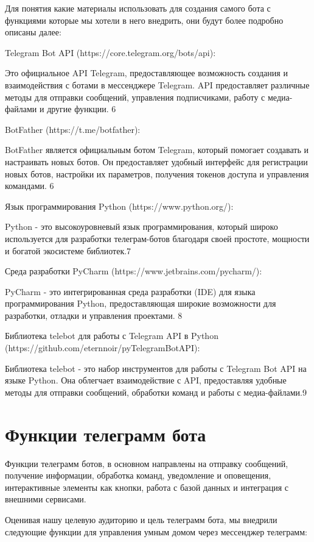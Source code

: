 Для понятия какие материалы использовать для создания самого бота с функциями которые мы хотели в него внедрить, они будут более подробно описаны далее: 

Telegram Bot API (https://core.telegram.org/bots/api):

Это официальное API Telegram, предоставляющее возможность создания и взаимодействия с ботами в мессенджере Telegram. API предоставляет различные методы для отправки сообщений, управления подписчиками, работу с медиа-файлами и другие функции. 6

BotFather (https://t.me/botfather):

BotFather является официальным ботом Telegram, который помогает создавать и настраивать новых ботов. Он предоставляет удобный интерфейс для регистрации новых ботов, настройки их параметров, получения токенов доступа и управления командами. 6

Язык программирования Python (https://www.python.org/):

Python - это высокоуровневый язык программирования, который широко используется для разработки телеграм-ботов благодаря своей простоте, мощности и богатой экосистеме библиотек.7

Среда разработки PyCharm (https://www.jetbrains.com/pycharm/):

PyCharm - это интегрированная среда разработки (IDE) для языка программирования Python, предоставляющая широкие возможности для разработки, отладки и управления проектами. 8

Библиотека telebot для работы с Telegram API в Python (https://github.com/eternnoir/pyTelegramBotAPI):

Библиотека telebot - это набор инструментов для работы с Telegram Bot API на языке Python. Она облегчает взаимодействие с API, предоставляя удобные методы для отправки сообщений, обработки команд и работы с медиа-файлами.9

\section{Функции телеграмм бота}

Функции телеграмм ботов, в основном направлены на отправку сообщений, получение информации, обработка команд, уведомление и оповещения, интерактивные элементы как кнопки, работа с базой данных и интеграция с внешними сервисами.

Оценивая нашу целевую аудиторию и цель телеграмм бота, мы внедрили следующие функции для управления умным домом через мессенджер телеграмм:

